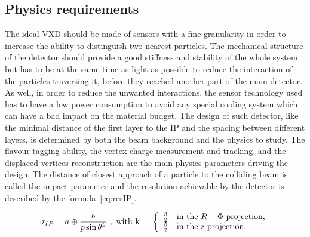    \subsection{Physics requirements}


   
   The ideal \gls{VXD} should be made of sensors with a fine granularity in order to increase the ability to distinguish two nearest particles.
   The mechanical structure of the detector should provide a good stiffness and stability of the whole system but has to be at the same time as light as possible to reduce the interaction of the particles traversing it, before they reached another part of the main detector.
   As well, in order to reduce the unwanted interactions, the sensor technology used has to have a low power consumption to avoid any special cooling system which can have a bad impact on the material budget.
   The design of such detector, like the minimal distance of the first layer to the \gls{IP} and the spacing between different layers, is determined by both the beam background and the physics to study.
   The flavour tagging ability, the vertex charge measurement and tracking, and the displaced vertices reconstruction are the main physics parameters driving the design.
   The distance of closest approach of a particle to the colliding beam is called the impact parameter and the resolution achievable by the detector is described by the formula~\ref{eq:resIP}\cite{Battaglia2011}.
    
    \begin{equation}
      \sigma_{IP} = a \oplus \frac{b}{p \sin{\theta}^{k}}~\rm{,~with~k~=}
      \left\{
        \begin{array}{r l}
          \frac{3}{2} & \text{in the } R - \Phi \text{ projection,} \\
          \frac{5}{2} & \text{in the z projection.}
        \end{array}
      \right. 
      \label{eq:resIP}
    \end{equation}

